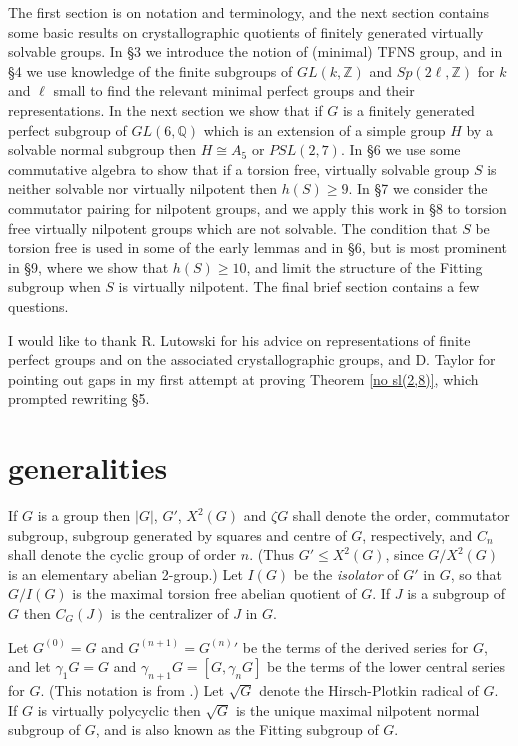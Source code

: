 \documentclass[12pt]{amsart}
\renewcommand{\geq}{\geqslant}
\renewcommand{\leq}{\leqslant}
\begin{document}
The first section is on notation and terminology,
and the next section contains some basic results on crystallographic quotients
of finitely generated virtually solvable groups.
In \S3 we introduce the notion of (minimal) TFNS group,
and in \S4 we use knowledge of the finite subgroups of $GL(k,\mathbb{Z})$ 
and $Sp(2\ell,\mathbb{Z})$ for $k$ and $\ell$ small \cite{Ki, PP}
to find the relevant minimal perfect groups and their representations.
In the next section we show that if $G$ is a finitely generated perfect subgroup of 
$GL(6,\mathbb{Q})$ which is an extension of a simple group $H$ 
by a solvable normal subgroup then $H\cong{A_5}$ or $PSL(2,7)$.
In \S6 we use some commutative algebra to show that if a torsion free,
virtually solvable group $S$ is neither solvable nor virtually nilpotent then $h(S)\geq9$. 
In \S7 we consider the commutator pairing for nilpotent groups,
and we apply this work in \S8 to torsion free virtually nilpotent groups 
which are not solvable.
The condition that $S$ be torsion free is used in some of the early lemmas and in \S6, 
but is most prominent in \S9,
where we show that $h(S)\geq10$, 
and limit the structure of the Fitting subgroup when $S$ is virtually nilpotent.
The final brief section contains a few questions.

I would like to thank R. Lutowski for his advice on representations of
finite perfect groups and on the associated crystallographic groups,
and D. Taylor for pointing out gaps in my first attempt at proving Theorem \ref{no sl(2,8)},
which prompted rewriting \S5.

\section{generalities}

If $G$ is a group then $|G|$, $G'$, $X^2(G)$ and $ \zeta{G}$ shall denote the order,
commutator subgroup,  subgroup generated by squares 
and centre of $G$, respectively,
and $C_n$ shall denote the cyclic group of order $n$.
(Thus $G'\leq{X^2(G)}$, since $G/X^2(G)$ is an elementary abelian 2-group.)
Let $I(G)$ be the {\it isolator\/} of $G'$ in $G$,
so that $G/I(G)$ is the maximal torsion free abelian quotient of $G$.
If $J$ is a subgroup of $G$ then $C_G(J)$ is the centralizer of $J$ in $G$.

Let $G^{(0)}=G$ and $G^{(n+1)}={G^{(n)}}'$ be the terms of the derived series for $G$, 
and let $\gamma_1G=G$ and $\gamma_{n+1}G=[G,\gamma_nG]$ be the terms
of the lower central series for $G$.
(This notation is from \cite{Ro}.)
Let $\sqrt{G}$ denote the Hirsch-Plotkin radical of $G$.
If $G$ is virtually polycyclic then $\sqrt{G}$ is the unique maximal nilpotent
normal subgroup of $G$, and is also known as the Fitting subgroup of $G$.
\end{document}
